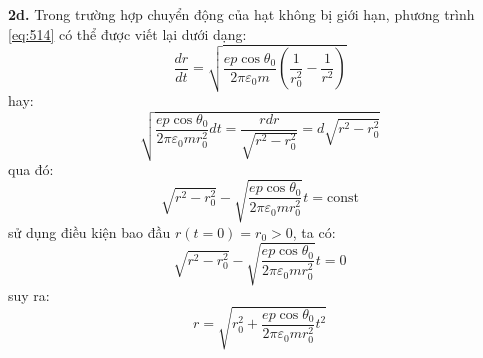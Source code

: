 \noindent\textbf{2d.} Trong trường hợp chuyển động của hạt không bị giới hạn, phương trình \eqref{eq:514} có thể được viết lại dưới dạng:
\begin{equation}
  \label{eq:518}
  \frac{dr}{dt}=\sqrt{\frac{ep\cos\theta_{0}}{2\pi\varepsilon_{0}m}\left(\frac{1}{r_{0}^{2}}-\frac{1}{r^{2}}\right)}
\end{equation}
hay:
\begin{equation*}
  \sqrt{\frac{ep\cos\theta_{0}}{2\pi\varepsilon_{0}mr_{0}^{2}}dt=\frac{rdr}{\sqrt{r^{2}-r_{0}^{2}}}=d\sqrt{r^{2}-r_{0}^{2}}}
\end{equation*}
qua đó:
\begin{equation}
  \label{eq:519}
  \sqrt{r^{2}-r_{0}^{2}}-\sqrt{\frac{ep\cos\theta_{0}}{2\pi\varepsilon_{0}mr_{0}^{2}}}t=\text{const}
\end{equation}
sử dụng điều kiện bao đầu $r(t=0)=r_{0}>0$, ta có:
\begin{equation*}
  \sqrt{r^{2}-r_{0}^{2}}-\sqrt{\frac{ep\cos\theta_{0}}{2\pi\varepsilon_{0}mr_{0}^{2}}}t=0
\end{equation*}
suy ra:
\begin{equation}
  \label{eq:520}
  r=\sqrt{r_{0}^{2}+\frac{ep\cos\theta_{0}}{2\pi\varepsilon_{0}mr_{0}^{2}}t^{2}}
\end{equation}